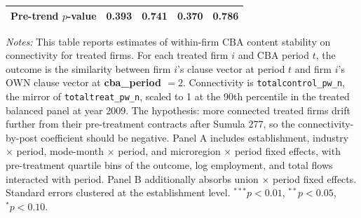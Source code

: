 \begin{table}[H]
\begin{tabular}{lcccc}
Pre-trend $p$-value & 0.393 & 0.741 & 0.370 & 0.786 \\
\bottomrule
\end{tabular}
\begin{minipage}{\linewidth}
\footnotesize\vspace{4pt}
\textit{Notes:} This table reports estimates of within-firm CBA content stability on connectivity for treated firms. For each treated firm $i$ and CBA period $t$, the outcome is the similarity between firm $i$'s clause vector at period $t$ and firm $i$'s OWN clause vector at \textbf{cba\_period $= 2$}. Connectivity is \texttt{totalcontrol\_pw\_n}, the mirror of \texttt{totaltreat\_pw\_n}, scaled to 1 at the 90th percentile in the treated balanced panel at year 2009. The hypothesis: more connected treated firms drift further from their pre-treatment contracts after Sumula 277, so the connectivity-by-post coefficient should be negative. Panel A includes establishment, industry $\times$ period, mode-month $\times$ period, and microregion $\times$ period fixed effects, with pre-treatment quartile bins of the outcome, log employment, and total flows interacted with period. Panel B additionally absorbs union $\times$ period fixed effects. Standard errors clustered at the establishment level. $^{***}p<0.01$, $^{**}p<0.05$, $^{*}p<0.10$.
\end{minipage}
\end{table}
